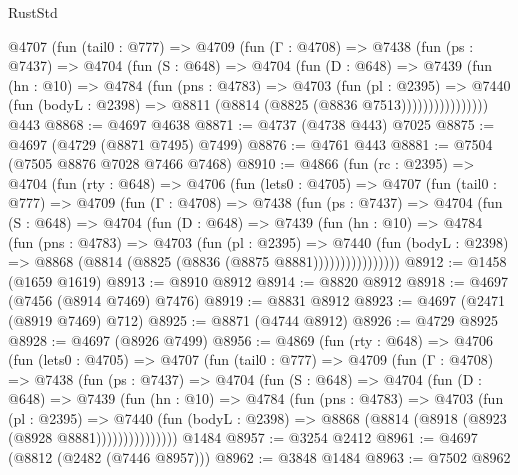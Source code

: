 \begin{lexlean}{RustStd}
\begin{coremodule}
          @4707
            (fun (tail0 : @777) =>
            @4709
              (fun (Γ : @4708) =>
              @7438
                (fun (ps : @7437) =>
                @4704
                  (fun (S : @648) =>
                  @4704
                    (fun (D : @648) =>
                    @7439
                      (fun (hn : @10) =>
                      @4784
                        (fun (pns : @4783) =>
                        @4703
                          (fun (pl : @2395) =>
                          @7440
                            (fun (bodyL : @2398) => @8811 (@8814 (@8825 (@8836 @7513))))))))))))))))
    @443
@8868 := @4697 @4638
@8871 := @4737 (@4738 @443) @7025
@8875 := @4697 (@4729 (@8871 @7495) @7499)
@8876 := @4761 @443
@8881 := @7504 (@7505 @8876 @7028 @7466 @7468)
@8910 := @4866
    (fun (rc : @2395) =>
    @4704
      (fun (rty : @648) =>
      @4706
        (fun (lets0 : @4705) =>
        @4707
          (fun (tail0 : @777) =>
          @4709
            (fun (Γ : @4708) =>
            @7438
              (fun (ps : @7437) =>
              @4704
                (fun (S : @648) =>
                @4704
                  (fun (D : @648) =>
                  @7439
                    (fun (hn : @10) =>
                    @4784
                      (fun (pns : @4783) =>
                      @4703
                        (fun (pl : @2395) =>
                        @7440
                          (fun (bodyL : @2398) =>
                          @8868 (@8814 (@8825 (@8836 (@8875 @8881))))))))))))))))
@8912 := @1458 (@1659 @1619)
@8913 := @8910 @8912
@8914 := @8820 @8912
@8918 := @4697 (@7456 (@8914 @7469) @7476)
@8919 := @8831 @8912
@8923 := @4697 (@2471 (@8919 @7469) @712)
@8925 := @8871 (@4744 @8912)
@8926 := @4729 @8925
@8928 := @4697 (@8926 @7499)
@8956 := @4869
    (fun (rty : @648) =>
    @4706
      (fun (lets0 : @4705) =>
      @4707
        (fun (tail0 : @777) =>
        @4709
          (fun (Γ : @4708) =>
          @7438
            (fun (ps : @7437) =>
            @4704
              (fun (S : @648) =>
              @4704
                (fun (D : @648) =>
                @7439
                  (fun (hn : @10) =>
                  @4784
                    (fun (pns : @4783) =>
                    @4703
                      (fun (pl : @2395) =>
                      @7440
                        (fun (bodyL : @2398) =>
                        @8868 (@8814 (@8918 (@8923 (@8928 @8881)))))))))))))))
    @1484
@8957 := @3254 @2412
@8961 := @4697 (@8812 (@2482 (@7446 @8957)))
@8962 := @3848 @1484
@8963 := @7502 @8962

\end{coremodule}
\end{lexlean}
